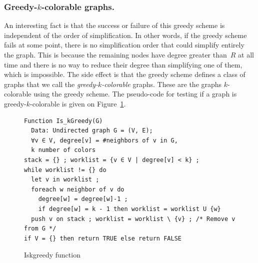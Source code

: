 {\subsubsection{Greedy-$k$-colorable graphs.}

An interesting fact is that the success or failure of this greedy scheme is 
independent of the order of simplification. In other words, if the greedy 
scheme fails at some point, there is no simplification order that could 
simplify entirely the graph. This is because the remaining nodes have degree 
greater than~$R$ at all time and there is no way to reduce their degree than 
simplifying one of them, which is impossible. The side effect is that the 
greedy scheme defines a class of graphs that we call the 
\emph{greedy-$k$-colorable} graphs. These are the graphs $k$-colorable using 
the greedy scheme. The pseudo-code for testing if a graph is 
greedy-$k$-colorable is given on Figure~\ref{code:is-k-greedy}.

\begin{figure}
\begin{verbatim}
Function Is_kGreedy(G)
  Data: Undirected graph G = (V, E);
  ∀v ∈ V, degree[v] = #neighbors of v in G,
  k number of colors
stack = {} ; worklist = {v ∈ V | degree[v] < k} ;
while worklist != {} do
  let v in worklist ;
  foreach w neighbor of v do
    degree[w] = degree[w]-1 ;
    if degree[w] = k - 1 then worklist = worklist U {w}
  push v on stack ; worklist = worklist \ {v} ; /* Remove v from G */
if V = {} then return TRUE else return FALSE
\end{verbatim}
\caption{Iskgreedy function}
\label{code:is-k-greedy}
\end{figure}

}
